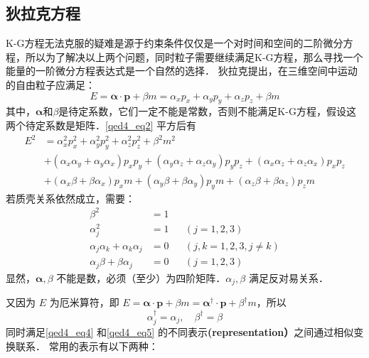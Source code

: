 \subsection{狄拉克方程}
K-G方程无法克服的疑难是源于约束条件仅仅是一个对时间和空间的二阶微分方程，所以为了解决以上两个问题，同时粒子需要继续满足K-G方程，那么寻找一个能量的一阶微分方程表达式是一个自然的选择．
狄拉克提出，在三维空间中运动的自由粒子应满足：
\begin{equation}\label{qed4_eq2}
E=\boldsymbol{\alpha} \cdot \boldsymbol{p}+\beta m=\alpha_{x} p_{x}+\alpha_{y} p_{y}+\alpha_{z} p_{z}+\beta m
\end{equation}
其中，$\boldsymbol {\alpha}$和$\beta$是待定系数，它们一定不能是常数，否则不能满足K-G方程，假设这两个待定系数是矩阵．\autoref{qed4_eq2} 平方后有
\begin{equation}\label{qed4_eq3}
\begin{aligned}
E^{2} &=\alpha_{x}^{2} p_{x}^{2}+\alpha_{y}^{2} p_{y}^{2}+\alpha_{z}^{2} p_{z}^{2}+\beta^{2} m^{2} \\
&+\left(\alpha_{x} \alpha_{y}+\alpha_{y} \alpha_{x}\right) p_{x} p_{y}+\left(\alpha_{y} \alpha_{z}+\alpha_{z} \alpha_{y}\right) p_{y} p_{z}+\left(\alpha_{x} \alpha_{z}+\alpha_{z} \alpha_{x}\right) p_{x} p_{z} \\
&+\left(\alpha_{x} \beta+\beta \alpha_{x}\right) p_{x} m+\left(\alpha_{y} \beta+\beta \alpha_{y}\right) p_{y} m+\left(\alpha_{z} \beta+\beta \alpha_{z}\right) p_{z} m
\end{aligned}
\end{equation}
若质壳关系依然成立，需要：
\begin{equation}\label{qed4_eq4}
\begin{aligned}
\beta^{2} &=1 & & \\
\alpha_j^{2} &=1 & &(j=1,2,3) \\
\alpha_j \alpha_k+\alpha_k \alpha_j &=0 & &(j, k=1,2,3, j \neq k) \\
\alpha_j \beta+\beta \alpha_j &=0 & &(j=1,2,3)
\end{aligned}
\end{equation}
显然，$\boldsymbol{\alpha}, \beta$ 不能是数，必须（至少）为四阶矩阵．$\alpha_j, \beta$ 满足反对易关系．

又因为 $E$ 为厄米算符，即 $E=\boldsymbol{\alpha} \cdot \boldsymbol{p}+\beta m=\boldsymbol{\alpha}^\dagger \cdot \boldsymbol{p}+\beta^\dagger m$，所以
\begin{equation}\label{qed4_eq5}
\alpha_j^{\dagger}=\alpha_j, \quad \beta^{\dagger}=\beta
\end{equation}
同时满足\autoref{qed4_eq4} 和\autoref{qed4_eq5} 的不同表示\textbf{(representation）}之间通过相似变换联系．
常用的表示有以下两种：

